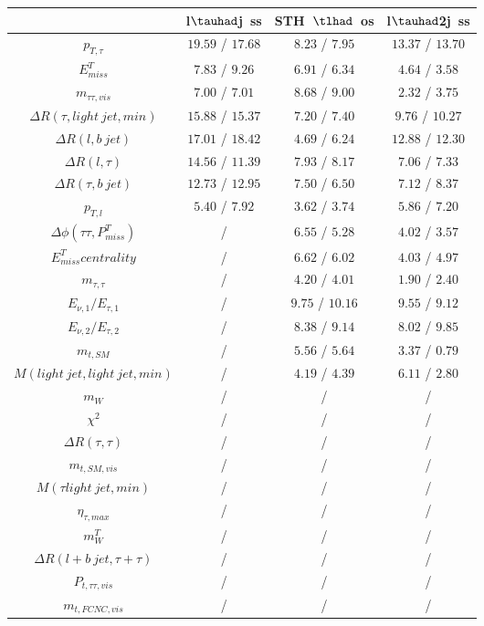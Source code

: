 \centering
\begin{tabular}{|c|c|c|c|} \hline
 & l$\tauhad$j~ss & STH~$\tlhad$~os & l$\tauhad$2j~ss\\\hline
$p_{T,\tau }$ & $19.59$ / $17.68$ & $8.23$ / $7.95$ & $13.37$ / $13.70$\\\hline
$E^{T}_{miss}$ & $7.83$ / $9.26$ & $6.91$ / $6.34$ & $4.64$ / $3.58$\\\hline
$m_{\tau \tau ,vis}$ & $7.00$ / $7.01$ & $8.68$ / $9.00$ & $2.32$ / $3.75$\\\hline
$\Delta R(\tau ,light~jet,min)$ & $15.88$ / $15.37$ & $7.20$ / $7.40$ & $9.76$ / $10.27$\\\hline
$\Delta R(l,b~jet)$ & $17.01$ / $18.42$ & $4.69$ / $6.24$ & $12.88$ / $12.30$\\\hline
$\Delta R(l,\tau )$ & $14.56$ / $11.39$ & $7.93$ / $8.17$ & $7.06$ / $7.33$\\\hline
$\Delta R(\tau ,b~jet)$ & $12.73$ / $12.95$ & $7.50$ / $6.50$ & $7.12$ / $8.37$\\\hline
$p_{T,l}$ & $5.40$ / $7.92$ & $3.62$ / $3.74$ & $5.86$ / $7.20$\\\hline
$\Delta\phi(\tau \tau ,P^{T}_{miss})$ &  / & $6.55$ / $5.28$ & $4.02$ / $3.57$\\\hline
$E^{T}_{miss} centrality$ &  / & $6.62$ / $6.02$ & $4.03$ / $4.97$\\\hline
$m_{\tau ,\tau }$ &  / & $4.20$ / $4.01$ & $1.90$ / $2.40$\\\hline
$E_{\nu,1}/E_{\tau ,1}$ &  / & $9.75$ / $10.16$ & $9.55$ / $9.12$\\\hline
$E_{\nu,2}/E_{\tau ,2}$ &  / & $8.38$ / $9.14$ & $8.02$ / $9.85$\\\hline
$m_{t,SM}$ &  / & $5.56$ / $5.64$ & $3.37$ / $0.79$\\\hline
$M(light~jet,light~jet,min)$ &  / & $4.19$ / $4.39$ & $6.11$ / $2.80$\\\hline
$m_{W}$ &  / &  / &  /\\\hline
$\chi^{2}$ &  / &  / &  /\\\hline
$\Delta R(\tau ,\tau )$ &  / &  / &  /\\\hline
$m_{t,SM,vis}$ &  / &  / &  /\\\hline
$M(\tau  light~jet,min)$ &  / &  / &  /\\\hline
$\eta_{\tau ,max}$ &  / &  / &  /\\\hline
$m^{T}_{W}$ &  / &  / &  /\\\hline
$\Delta R(l+b~jet,\tau +\tau )$ &  / &  / &  /\\\hline
$P_{t,\tau \tau ,vis}$ &  / &  / &  /\\\hline
$m_{t,FCNC,vis}$ &  / &  / &  /\\\hline
\end{tabular}
